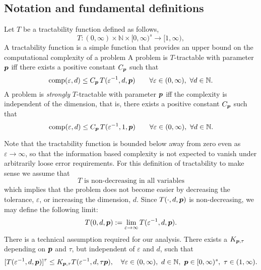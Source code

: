 \documentclass[11pt,a4paper]{article}
\begin{document}
\subsection{Notation and fundamental definitions}
Let $T$ be a tractability function defined as follows,
\[
T :(0,\infty) \times \mathbb{N} \times [0,\infty)^s \rightarrow [1,\infty),
\]
A tractability function is a simple function that provides an upper bound on the computational complexity of a problem
A problem is $T$-tractable with parameter $\boldsymbol{p}$ iff there exists a positive constant $C_{\boldsymbol{p}}$ such that
\begin{equation} \label{eq:tract_def}
	\operatorname{comp}(\varepsilon,d) \le C_{\boldsymbol{p}}\, T(\varepsilon^{-1},d,\boldsymbol{p}) \qquad \forall \varepsilon \in (0,\infty), \ \forall d \in \mathbb{N}.
\end{equation}
A problem is \emph{strongly}
$T$-tractable with parameter $\boldsymbol{p}$ iff the complexity is independent of the dimension, that is, there exists a positive constant $C_{\boldsymbol{p}}$ such that
\begin{equation} \label{eq:tract_def}
	\operatorname{comp}(\varepsilon,d) \le C_{\boldsymbol{p}}\, T(\varepsilon^{-1},1,\boldsymbol{p}) \qquad \forall \varepsilon \in (0,\infty), \ \forall d \in \mathbb{N}.
\end{equation}

Note that the tractability function is bounded below away from zero even as $\varepsilon \to \infty$, so that the information based complexity is not expected to vanish under arbitrarily loose error requirements.  For this definition of tractability to make sense we assume that
\begin{equation}
	T \text{ is non-decreasing in all variables}
\end{equation}
which implies that the problem does not become easier by decreasing the tolerance, $\varepsilon$, or increasing the dimension, $d$. Since $T(\cdot,d,\boldsymbol{p})$ is non-decreasing, we may define the following limit:
\begin{equation}
	T(0,d,\boldsymbol{p}):=\lim_{\varepsilon\to\infty}T(\varepsilon^{-1},d,\boldsymbol{p}).
\end{equation}
There is a technical assumption required for our analysis.  There exists a $K_{\boldsymbol{p},\tau}$ depending on $\boldsymbol{p}$ and $\tau$, but  independent of $\varepsilon$ and $d$, such that
\begin{equation} \label{eq:ptauassume}
	[T(\varepsilon^{-1},d,\boldsymbol{p})]^\tau \le K_{\boldsymbol{p},\tau} T(\varepsilon^{-1},d,\tau \boldsymbol{p}),   \quad \forall \varepsilon \in (0,\infty), \ d \in \mathbb{N}, \ \boldsymbol{p}\in[0,\infty)^s, \ \tau\in (1,\infty).
\end{equation}
\end{document}
